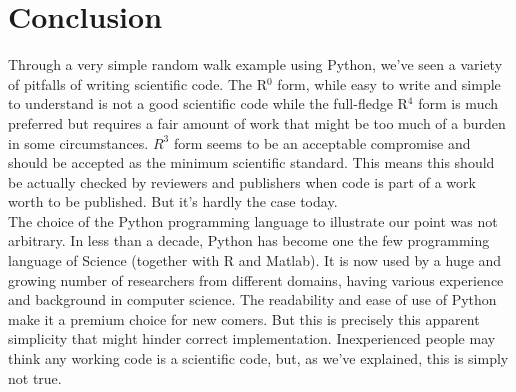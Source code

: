 \documentclass[a4paper,11pt]{article}
\begin{document}
\section*{Conclusion}

Through a very simple random walk example using Python, we've seen a variety of pitfalls of writing scientific code. The R$^0$ form, while easy to write and simple to understand is not a good scientific code while the full-fledge R$^{4}$ form is much preferred but requires a fair amount of work that might be too much of a burden in some circumstances. $R^3$ form seems to be an acceptable compromise and should be accepted as the minimum scientific standard. This means this should be actually checked by reviewers and publishers when code is part of a work worth to be published. But it's hardly the case today.\\

The choice of the Python programming language to illustrate our point was not arbitrary. In less than a decade, Python has become one the few programming language of Science (together with R and Matlab). It is now used by a huge and growing number of researchers from different domains, having various experience and background in computer science. The readability and ease of use of Python make it a premium choice for new comers. But this is precisely this apparent simplicity that might hinder correct implementation. Inexperienced people may think any working code is a scientific code, but, as we've explained, this is simply not true.




\renewcommand*{\bibfont}{\small}
\printbibliography[title=References]
\end{document}
